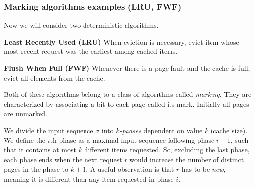 \subsubsection{Marking algorithms examples (LRU, FWF)}
Now we will consider two deterministic algorithms.
\begin{myalgo}
 \textbf{Least Recently Used (LRU)}
 \newline
When eviction is necessary, evict item whose most recent request was the 
earliest among cached items.
\end{myalgo}
\begin{myalgo}
  \textbf{Flush When Full (FWF)}
  \newline
Whenever there is a page fault and the cache is full, evict all elements from the cache.
\end{myalgo}
Both of these algorithms belong to a class of algorithms called \textit{marking}. 
They are characterized by associating a bit to each page called
its mark. Initially all pages are unmarked. 

We divide the input sequence $\sigma$ into $k$\textit{-phases} dependent on value $k$ 
(cache size). We define the $i$th phase as a maximal input sequence following 
phase $i-1$, such that it contains at most $k$ different items requested. So, 
excluding the last phase, each phase ends when the next request $r$ would 
increase the number of distinct pages in the phase to $k+1$. A useful observation is 
that $r$ has to be \textit{new}, meaning it is different than any item requested 
in phase $i$.


